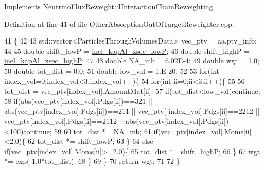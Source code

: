 Implements \hyperlink{class_neutrino_flux_reweight_1_1_i_interaction_chain_reweighting_ae28403553637013fdc720674ee24c7c5}{Neutrino\-Flux\-Reweight\-::\-I\-Interaction\-Chain\-Reweighting}.



Definition at line 41 of file Other\-Absorption\-Out\-Of\-Target\-Reweighter.\-cpp.


\begin{DoxyCode}
41                                                                                             \{
42     
43     std::vector<ParticlesThroughVolumesData>  vec\_ptv = aa.ptv\_info;
44 
45     \textcolor{keywordtype}{double} shift\_lowP = \hyperlink{class_neutrino_flux_reweight_1_1_other_absorption_out_of_target_reweighter_a1fa8ca53fe660fcc66886eb55d9db296}{inel\_kapAl\_xsec\_lowP};
46     \textcolor{keywordtype}{double} shift\_highP = \hyperlink{class_neutrino_flux_reweight_1_1_other_absorption_out_of_target_reweighter_a7fd78bf2576386f2854cca235f000e2a}{inel\_kapAl\_xsec\_highP};
47     
48     \textcolor{keywordtype}{double} NA\_mb    = 6.02E-4;
49     \textcolor{keywordtype}{double} wgt      = 1.0;
50     \textcolor{keywordtype}{double} tot\_dist = 0.0;
51     \textcolor{keywordtype}{double} low\_val  = 1.E-20;   
52     
53     \textcolor{keywordflow}{for}(\textcolor{keywordtype}{int} index\_vol=0;index\_vol<3;index\_vol++)\{
54       \textcolor{keywordflow}{for}(\textcolor{keywordtype}{int} ii=0;ii<3;ii++)\{
55         
56         tot\_dist = vec\_ptv[index\_vol].AmountMat[ii];
57         \textcolor{keywordflow}{if}(tot\_dist<low\_val)\textcolor{keywordflow}{continue};
58         \textcolor{keywordflow}{if}(abs(vec\_ptv[index\_vol].Pdgs[ii])==321 || abs(vec\_ptv[index\_vol].Pdgs[ii])==211 || vec\_ptv[
      index\_vol].Pdgs[ii]==2212 || vec\_ptv[index\_vol].Pdgs[ii]==2112 || abs(vec\_ptv[index\_vol].Pdgs[ii])<100)\textcolor{keywordflow}{continue};
59         
60         tot\_dist *= NA\_mb;
61         \textcolor{keywordflow}{if}(vec\_ptv[index\_vol].Moms[ii]<2.0)\{
62           tot\_dist *= shift\_lowP;
63         \}
64         \textcolor{keywordflow}{else} \textcolor{keywordflow}{if}(vec\_ptv[index\_vol].Moms[ii]>=2.0)\{
65           tot\_dist *= shift\_highP;
66         \}
67         wgt *= exp(-1.0*tot\_dist);   
68       \}
69     \}
70     \textcolor{keywordflow}{return} wgt;
71     
72   \}
\end{DoxyCode}
